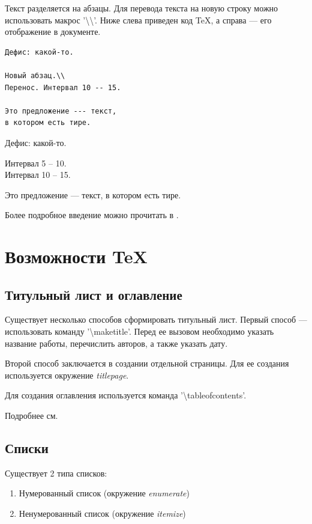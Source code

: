 Текст разделяется на абзацы.
Для перевода текста на новую строку можно использовать макрос '{\textbackslash}{\textbackslash}'.
Ниже слева приведен код TeX, а справа --- его отображение в документе.
\begin{multicols}{2}
\begin{verbatim}
Дефис: какой-то.

Новый абзац.\\
Перенос. Интервал 10 -- 15.

Это предложение --- текст,
в котором есть тире.
\end{verbatim}
  \columnbreak
Дефис: какой-то.

Интервал 5 -- 10.\\
Интервал 10 -- 15.

Это предложение --- текст,
в котором есть тире.
\end{multicols}

Более подробное введение можно прочитать в \cite{latexWikibook}.

\section{Возможности TeX}
\subsection{Титульный лист и оглавление}
Существует несколько способов сформировать титульный лист.
Первый способ --- использовать команду '{\textbackslash}maketitle'.
Перед ее вызовом необходимо указать название работы, перечислить авторов, а также указать дату.

Второй способ заключается в создании отдельной страницы.
Для ее создания используется окружение {\em titlepage}.

Для создания оглавления используется команда '{\textbackslash}tableofcontents'.

Подробнее см. \cite{latexTitle,latexTOC}

\subsection{Списки}
Существует 2 типа списков:
\begin{enumerate}
\item Нумерованный список (окружение {\em enumerate})
\item \label{item2}
  Ненумерованный список (окружение {\em itemize})
\end{enumerate}


